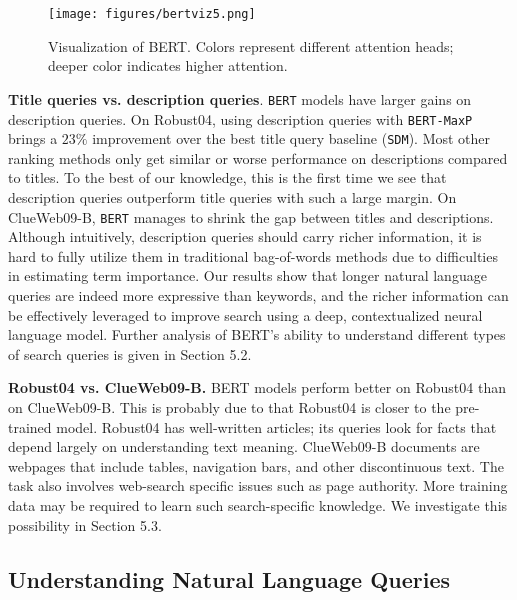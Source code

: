 \documentclass[sigconf]{acmart}
\begin{document}
\begin{figure}[tb]
     \centering
     
     \texttt{[image: figures/bertviz5.png]}
     \caption{Visualization of BERT. Colors represent different attention heads; deeper color indicates higher attention. } \label{fig:bertviz}
 \end{figure}
 
 

\textbf{Title queries vs. description queries}. \texttt{BERT} models have larger gains on description queries. On Robust04, using description queries with \texttt{BERT-MaxP} brings a $23\%$ improvement over the best title query baseline (\texttt{SDM}). Most other ranking methods only get similar or worse performance on descriptions compared to titles. To the best of our knowledge, this is the first time we see that description queries outperform title queries with such a large margin. On ClueWeb09-B,  \texttt{BERT} manages to shrink the gap between titles and descriptions. Although intuitively, description queries should carry richer information, it is hard to fully utilize them in traditional bag-of-words methods due to difficulties in estimating term importance. Our results show that longer natural language queries are indeed more expressive than keywords, and the richer information can be effectively leveraged to improve search using a deep, contextualized neural language model. Further analysis of BERT's ability to understand different types of search queries is given in Section 5.2.

\textbf{Robust04 vs. ClueWeb09-B.} BERT models perform better on Robust04 than on ClueWeb09-B. This is probably due to that Robust04 is closer to the pre-trained model. Robust04 has well-written articles; its queries look for facts that depend largely on understanding text meaning. ClueWeb09-B documents are webpages that include tables, navigation bars, and other discontinuous text. The task also involves web-search specific issues such as page authority. More training data may be required to learn such search-specific knowledge. We investigate this possibility in Section 5.3.




 

\subsection{Understanding Natural Language Queries}
\end{document}
